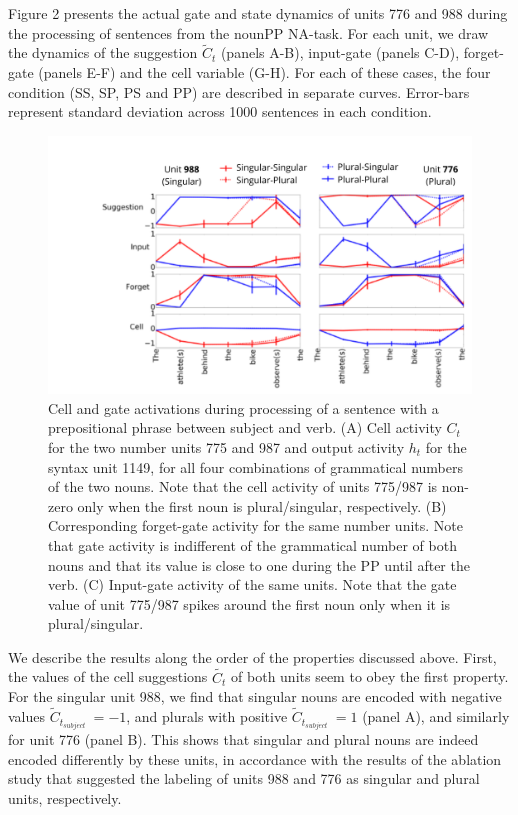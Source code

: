 Figure 2 presents the actual gate and state dynamics of units 776 and 988 during the processing of sentences from the nounPP NA-task. 
For each unit, we draw the dynamics of the suggestion $\tilde{C}_t$ (panels A-B), input-gate (panels C-D), forget-gate (panels E-F) and the cell variable (G-H). 
For each of these cases, the four condition (SS, SP, PS and PP) are described in separate curves. 
Error-bars represent standard deviation across 1000 sentences in each condition.

\begin{figure}[ht]
\includegraphics[width=\textwidth]{Figures/Figure2_number_units_775_987_suggestion_input_forget.png}
\caption{Cell and gate activations during processing of a sentence with a prepositional phrase between subject and verb. 
(A) Cell activity $C_t$ for the two number units 775 and 987 and output activity $h_t$ for the syntax unit 1149, for all four combinations of grammatical numbers of the two nouns. 
Note that the cell activity of units 775/987 is non-zero only when the first noun is plural/singular, respectively. 
(B) Corresponding forget-gate activity for the same number units. 
Note that gate activity is indifferent of the grammatical number of both nouns and that its value is close to one during the PP until after the verb. 
(C) Input-gate activity of the same units. 
Note that the gate value of unit 775/987 spikes around the first noun only when it is plural/singular.}
\end{figure}


We describe the results along the order of the properties discussed above. 
First, the values of the cell suggestions $\tilde{C_t}$ of both units seem to obey the first property. 
For the singular unit 988, we find that singular nouns are encoded with negative values $\tilde{C}_{t_{subject}}~=-1$, and plurals with positive $\tilde{C}_{t_{subject}}~=1$ (panel A), and similarly for unit 776 (panel B). 
This shows that singular and plural nouns are indeed encoded differently by these units, in accordance with the results of the ablation study that suggested the labeling of units 988 and 776 as singular and plural units, respectively.


